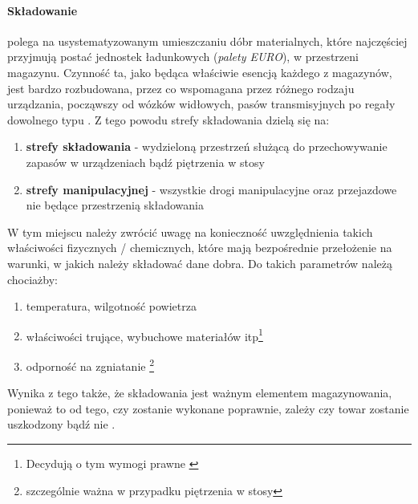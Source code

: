 		\paragraph{Składowanie} polega na usystematyzowanym umieszczaniu dóbr materialnych, które najczęściej przyjmują
		postać jednostek ładunkowych (\textit{palety EURO}), w przestrzeni magazynu. Czynność ta, jako będąca właściwie
		esencją każdego z magazynów, jest bardzo rozbudowana, przez co wspomagana przez różnego rodzaju urządzania, począwszy
		od wózków widłowych, pasów transmisyjnych po regały dowolnego typu . Z tego powodu strefy składowania dzielą się na:
		\begin{enumerate}
			\item \textbf{strefy składowania} - wydzieloną przestrzeń służącą do 
			przechowywanie zapasów w urządzeniach bądź piętrzenia w stosy
			\item \textbf{strefy manipulacyjnej} - wszystkie drogi manipulacyjne 
			oraz przejazdowe nie będące przestrzenią składowania
		\end{enumerate}	
		W tym miejscu należy zwrócić uwagę na konieczność uwzględnienia takich właściwości fizycznych / chemicznych, które
		mają bezpośrednie przełożenie na warunki, w jakich należy składować dane dobra. Do takich parametrów należą
		chociażby:
		\begin{enumerate}
			\item temperatura, wilgotność powietrza
			\item właściwości trujące, wybuchowe materiałów itp\footnote{Decydują o tym wymogi prawne \cite{ustawa_flamableMaterials}}
			\item odporność na zgniatanie \footnote{szczególnie ważna w przypadku piętrzenia w stosy}
		\end{enumerate}			
		Wynika z tego także, że składowania jest ważnym elementem magazynowania, ponieważ to od tego, czy zostanie
		wykonane poprawnie, zależy czy towar zostanie uszkodzony bądź nie \cite{EWSS}.
